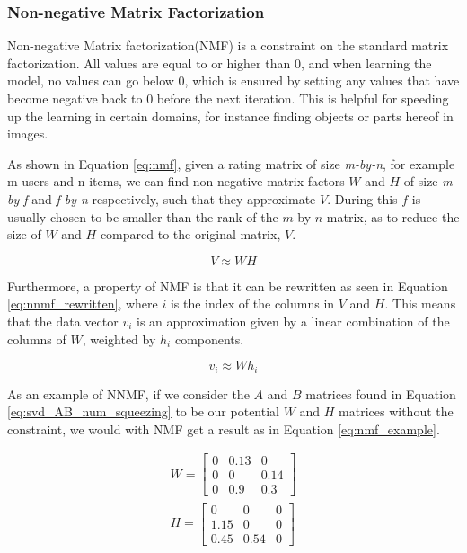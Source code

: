 \subsubsection{Non-negative Matrix Factorization}

Non-negative Matrix factorization(NMF) is a constraint on the standard matrix factorization. All values are equal to or higher than 0, and when learning the model, no values can go below 0, which is ensured by setting any values that have become negative back to 0 before the next iteration. This is helpful for speeding up the learning in certain domains, for instance finding objects or parts hereof in images\cite{nnmf}.

As shown in Equation \ref{eq:nmf}, given a rating matrix of size \textit{m-by-n}, for example m users and n items, we can find non-negative matrix factors $W$ and $H$ of size \textit{m-by-f} and \textit{f-by-n} respectively, such that they approximate $V$. During this $f$ is usually chosen to be smaller than the rank of the $m$ by $n$ matrix, as to reduce the size of $W$ and $H$ compared to the original matrix, $V$\cite{LeeNMF}.

\begin{equation} \label{eq:nmf}
	V \approx W H
\end{equation}

Furthermore, a property of NMF is that it can be rewritten as seen in Equation \ref{eq:nnmf_rewritten}, where $i$ is the index of the columns in $V$ and $H$. This means that the data vector $v_{i}$ is an approximation given by a linear combination of the columns of $W$, weighted by $h_{i}$ components\cite{LeeNMF}.

\begin{equation} \label{eq:nnmf_rewritten}
	v_{i} \approx W h_{i}
\end{equation}

As an example of NNMF, if we consider the $A$ and $B$ matrices found in Equation \ref{eq:svd_AB_num_squeezing} to be our potential $W$ and $H$ matrices without the constraint, we would with NMF get a result as in Equation \ref{eq:nmf_example}.

\begin{equation}\label{eq:nmf_example}
\begin{split}
W =
\begin{bmatrix}
0 & 0.13 & 0\\
0 & 0 & 0.14\\
0 & 0.9 & 0.3
\end{bmatrix}
\\
H = 
\begin{bmatrix}
0 & 0 & 0\\
1.15 & 0 & 0\\
0.45 & 0.54 & 0
\end{bmatrix}
\end{split}
\end{equation}